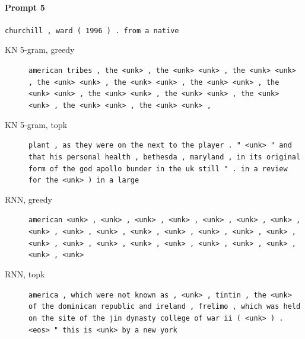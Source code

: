 \paragraph{Prompt 5} \texttt{churchill , ward ( 1996 ) . from a native}
\begin{description}
\item[KN 5-gram, greedy] \texttt{\small american tribes , the \textless{}unk\textgreater{} , the \textless{}unk\textgreater{} \textless{}unk\textgreater{} , the \textless{}unk\textgreater{} \textless{}unk\textgreater{} , the \textless{}unk\textgreater{} \textless{}unk\textgreater{} , the \textless{}unk\textgreater{} \textless{}unk\textgreater{} , the \textless{}unk\textgreater{} \textless{}unk\textgreater{} , the \textless{}unk\textgreater{} \textless{}unk\textgreater{} , the \textless{}unk\textgreater{} \textless{}unk\textgreater{} , the \textless{}unk\textgreater{} \textless{}unk\textgreater{} , the \textless{}unk\textgreater{} \textless{}unk\textgreater{} , the \textless{}unk\textgreater{} \textless{}unk\textgreater{} , the \textless{}unk\textgreater{} \textless{}unk\textgreater{} ,}
\item[KN 5-gram, topk] \texttt{\small plant , as they were on the next to the player . " \textless{}unk\textgreater{} " and that his personal health , bethesda , maryland , in its original form of the god apollo bunder in the uk still " . in a review for the \textless{}unk\textgreater{} ) in a large}
\item[RNN, greedy] \texttt{\small american \textless{}unk\textgreater{} , \textless{}unk\textgreater{} , \textless{}unk\textgreater{} , \textless{}unk\textgreater{} , \textless{}unk\textgreater{} , \textless{}unk\textgreater{} , \textless{}unk\textgreater{} , \textless{}unk\textgreater{} , \textless{}unk\textgreater{} , \textless{}unk\textgreater{} , \textless{}unk\textgreater{} , \textless{}unk\textgreater{} , \textless{}unk\textgreater{} , \textless{}unk\textgreater{} , \textless{}unk\textgreater{} , \textless{}unk\textgreater{} , \textless{}unk\textgreater{} , \textless{}unk\textgreater{} , \textless{}unk\textgreater{} , \textless{}unk\textgreater{} , \textless{}unk\textgreater{} , \textless{}unk\textgreater{} , \textless{}unk\textgreater{} , \textless{}unk\textgreater{} , \textless{}unk\textgreater{}}
\item[RNN, topk] \texttt{\small america , which were not known as , \textless{}unk\textgreater{} , tintin , the \textless{}unk\textgreater{} of the dominican republic and ireland , frelimo , which was held on the site of the jin dynasty college of war ii ( \textless{}unk\textgreater{} ) . \textless{}eos\textgreater{} " this is \textless{}unk\textgreater{} by a new york}

\end{description}
